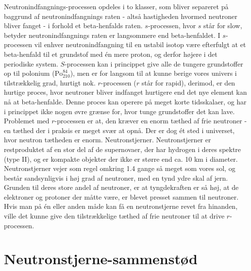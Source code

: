 \documentclass[twocolumn]{article}
\begin{document}
Neutronindfangnings-processen opdeles i to klasser, som bliver separeret på baggrund af neutronindfangnings raten - altså hastigheden hvormed neutroner bliver fanget - i forhold et beta-henfalds raten. $s$-processen, hvor $s$ står for slow, betyder neutronindfangnings raten er langsommere end beta-henfaldet. I $s$-processen vil enhver neutronindfangning til en ustabil isotop være efterfulgt at et beta-henfald til et grundstof med én mere proton, og derfor højere i det periodiske system. $S$-processen kan i princippet give alle de tungere grundstoffer op til polonium ($\mathrm{Po}_{210}^{84}$), men er for langsom til at kunne berige vores univers i tilstrækkelig grad, hurtigt nok. $r$-processen ($r$ står for rapid), derimod, er den hurtige proces, hvor neutroner bliver indfanget hurtigere end det nye element kan nå at beta-henfalde. Denne proces kan operere på meget korte tidsskalaer, og har i princippet ikke nogen øvre grænse for, hvor tunge grundstoffer det kan lave. Problemet med $r$-processen er at, den kræver en enorm tæthed af frie neutroner - en tæthed der i praksis er meget svær at opnå. Der er dog ét sted i universet, hvor neutron tætheden er enorm. Neutronstjerner. Neutronstjerner er restproduktet af en stor del af de supernovaer, der har hydrogen i deres spektre (type II), og er kompakte objekter der ikke er større end ca. 10 km i diameter. Neutronstjerner vejer som regel omkring 1.4 gange så meget som vores sol, og består sandsynligvis i høj grad af neutroner, med en tynd ydre skal af jern. Grunden til deres store andel af neutroner, er at tyngdekraften er så høj, at de elektroner og protoner der måtte være, er blevet presset sammen til neutroner. Hvis man på én eller anden måde kan få en neutronstjerne revet fra hinanden, ville det kunne give den tilstrækkelige tæthed af frie neutroner til at drive $r$-processen.

\section{Neutronstjerne-sammenstød}\label{ns}
\end{document}
